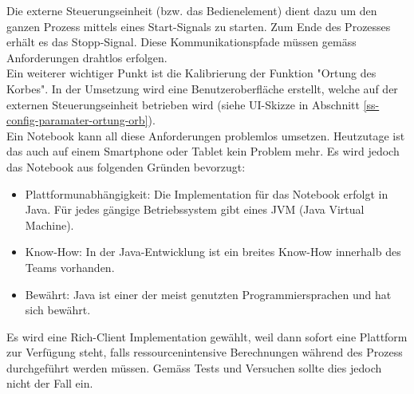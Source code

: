 Die externe Steuerungseinheit (bzw. das Bedienelement) dient dazu um den ganzen Prozess mittels eines Start-Signals zu starten. Zum Ende des Prozesses erhält es das Stopp-Signal. Diese Kommunikationspfade müssen gemäss Anforderungen drahtlos erfolgen. \\
Ein weiterer wichtiger Punkt ist die Kalibrierung der Funktion "Ortung des Korbes". In der Umsetzung wird eine Benutzeroberfläche erstellt, welche auf der externen Steuerungseinheit betrieben wird (siehe UI-Skizze in Abschnitt \ref{ss-config-paramater-ortung-orb}).\\
Ein Notebook kann all diese Anforderungen problemlos umsetzen. Heutzutage ist das auch auf einem Smartphone oder Tablet kein Problem mehr. Es wird jedoch das Notebook aus folgenden Gründen bevorzugt:

\begin{itemize}
	\item Plattformunabhängigkeit: Die Implementation für das Notebook erfolgt in Java. Für jedes gängige Betriebssystem gibt eines JVM (Java Virtual Machine).
	\item Know-How: In der Java-Entwicklung ist ein breites Know-How innerhalb des Teams vorhanden.
	\item Bewährt: Java ist einer der meist genutzten Programmiersprachen und hat sich bewährt.
\end{itemize}

Es wird eine Rich-Client Implementation gewählt, weil dann sofort eine Plattform zur Verfügung steht, falls ressourcenintensive Berechnungen während des Prozess durchgeführt werden müssen. Gemäss Tests und Versuchen sollte dies jedoch nicht der Fall ein.



